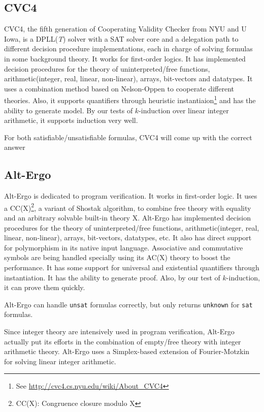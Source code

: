 \documentclass[10pt,letter]{article}
\theoremstyle{definition}
\begin{document}
\subsection{CVC4}

CVC4, the fifth generation of Cooperating Validity Checker from NYU and U Iowa, is a DPLL({\it T}) solver with a SAT solver core and a delegation path to different decision procedure implementations, each in charge of solving formulas in some background theory\cite{barrett:cvc4:2011}. It works for first-order logics. It has implemented decision procedures for the theory of uninterpreted/free functions, arithmetic(integer, real, linear, non-linear), arrays, bit-vectors and datatypes. It uses a combination method based on Nelson-Oppen to cooperate different theories. Also, it supports quantifiers through heuristic instantiaion\footnote{See \url{http://cvc4.cs.nyu.edu/wiki/About_CVC4}} and has the ability to generate model. By our tests of $k$-induction over linear integer arithmetic, it supports induction very well.

For both satisfiable/unsatisfiable formulas, CVC4 will come up with the correct answer

\subsection{Alt-Ergo}

Alt-Ergo is dedicated to program verification. It works in first-order logic. It uses a CC(X)\footnote{CC(X): Congruence closure modulo X}, a variant of Shostak algorithm, to combine free theory with equality and an arbitrary solvable built-in theory X\cite{conchonHDR2012}. Alt-Ergo has implemented decision procedures for the theory of uninterpreted/free functions, arithmetic(integer, real, linear, non-linear), arrays, bit-vectors, datatypes, etc. It also has direct support for polymorphism in its native input language. Associative and commutative symbols are being handled specially using its AC(X) theory to boost the performance. It has some support for universal and existential quantifiers through instantiation. It has the ability to generate proof. Also, by our test of $k$-induction, it can prove them quickly.

Alt-Ergo can handle {\tt unsat} formulas correctly, but only returns {\tt unknown} for {\tt sat} formulas.

Since integer theory are intensively used in program verification, Alt-Ergo actually put its efforts in the combination of empty/free theory with integer arithmetic theory. Alt-Ergo uses a Simplex-based extension of Fourier-Motzkin for solving linear integer arithmetic\cite{bobot:hal-00687640}.
\end{document}

